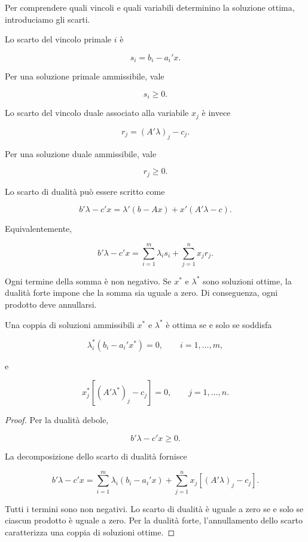 Per comprendere quali vincoli e quali variabili determinino la soluzione
ottima, introduciamo gli scarti.

Lo scarto del vincolo primale \(i\) \`e

\[
s_i
=
b_i-a_i'x.
\]

Per una soluzione primale ammissibile, vale

\[
s_i\geq0.
\]

Lo scarto del vincolo duale associato alla variabile \(x_j\) \`e invece

\[
r_j
=
(A'\lambda)_j-c_j.
\]

Per una soluzione duale ammissibile, vale

\[
r_j\geq0.
\]

Lo scarto di dualit\`a pu\`o essere scritto come

\[
b'\lambda-c'x
=
\lambda'(b-Ax)
+
x'(A'\lambda-c).
\]

Equivalentemente,

\[
b'\lambda-c'x
=
\sum_{i=1}^{m}\lambda_i s_i
+
\sum_{j=1}^{n}x_j r_j.
\]

Ogni termine della somma \`e non negativo. Se \(x^*\) e \(\lambda^*\) sono
soluzioni ottime, la dualit\`a forte impone che la somma sia uguale a zero.
Di conseguenza, ogni prodotto deve annullarsi.

\begin{theorem}

Una coppia di soluzioni ammissibili \(x^*\) e \(\lambda^*\) \`e ottima se e
solo se soddisfa

\[
\lambda_i^*
\left(
b_i-a_i'x^*
\right)
=
0,
\qquad
i=1,\ldots,m,
\]

e

\[
x_j^*
\left[
(A'\lambda^*)_j-c_j
\right]
=
0,
\qquad
j=1,\ldots,n.
\]

\end{theorem}

\begin{proof}

Per la dualit\`a debole,

\[
b'\lambda-c'x\geq0.
\]

La decomposizione dello scarto di dualit\`a fornisce

\[
b'\lambda-c'x
=
\sum_{i=1}^{m}
\lambda_i
\left(
b_i-a_i'x
\right)
+
\sum_{j=1}^{n}
x_j
\left[
(A'\lambda)_j-c_j
\right].
\]

Tutti i termini sono non negativi. Lo scarto di dualit\`a \`e uguale a zero
se e solo se ciascun prodotto \`e uguale a zero. Per la dualit\`a forte,
l'annullamento dello scarto caratterizza una coppia di soluzioni ottime.

\end{proof}

